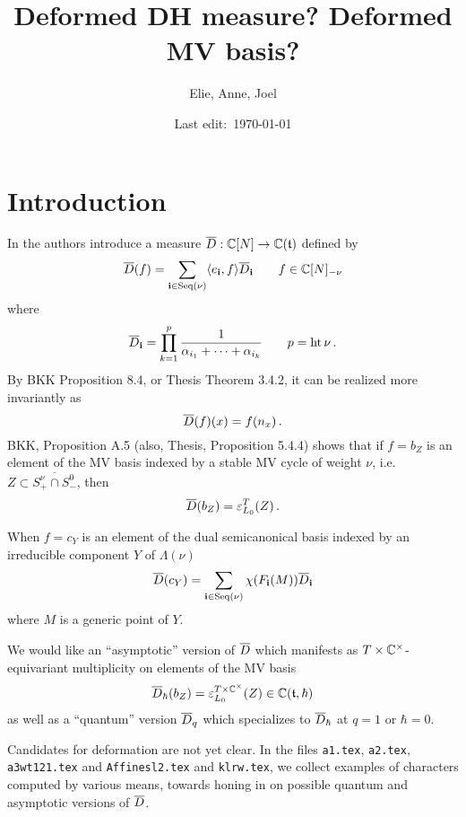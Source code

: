 \documentclass[11pt]{article}
\title{Deformed DH measure? Deformed MV basis?}
\author{Elie, Anne, Joel}
\date{Last edit:~\today}
\begin{document}
% 
\maketitle
% 
\section*{Introduction}
% 
In \cite{baumann2019mirkovic} the authors introduce a measure $\overline{D}:\mathbb C[N]\to\mathbb C(\mathfrak t)$ defined by 
\begin{equation}
    \label{eq:defbard}
    \overline{D}(f) = \sum_{\mathbf{i}\in\operatorname{Seq}(\nu)}\langle e_{\mathbf{i}},f\rangle\overline{D}_{\mathbf{i}}\qquad f \in \mathbb C[N]_{-\nu}
\end{equation}
where 
\begin{equation}
    \label{eq:bardi}
    \overline{D}_{\mathbf{i}} = \prod_{k=1}^p\frac{1}{\alpha_{i_1} + \cdots + \alpha_{i_k}} \qquad p = \operatorname{ht} \nu \,.
\end{equation}
By BKK Proposition 8.4, or Thesis Theorem 3.4.2, it can be realized more invariantly as 
\begin{equation}
    \label{eq:invbard}
     \overline{D}(f)(x) = f(n_x)\,.
\end{equation}
% 
BKK, Proposition A.5 (also, Thesis, Proposition 5.4.4) shows that if $f = b_Z$ is an element of the MV basis indexed by a stable MV cycle of weight $\nu$, i.e.\ $Z\subset \overline{S^\nu_+\cap S^0_-}$, then 
\begin{equation}
    \label{eq:bardaseqm}
    \overline{D}(b_Z) = \varepsilon_{L_0}^T (Z) \,. 
\end{equation}

When $f = c_Y$ is an element of the dual semicanonical basis indexed by an irreducible component $Y$ of $\Lambda(\nu)$
\begin{equation}
    \label{eq:bardaseu} %
    \barD(c_Y) = \sum_{\vi\in\Seq(\nu)}\chi(F_{\vi}(M))\barD_{\vi}
\end{equation}
where $M$ is a generic point of $Y$. 

We would like an ``asymptotic'' version of $\overline{D}$ which manifests as $T\times\mathbb C^\times$-equivariant multiplicity on elements of the MV basis
$$
\overline{D}_\hbar(b_Z) = \varepsilon_{L_0}^{T\times\mathbb C^\times} (Z) \in \mathbb C(\mathfrak t,\hbar)
$$
as well as a ``quantum'' version $\overline{D}_q$ which specializes to $\overline{D}_\hbar$ at $q = 1$ or $\hbar = 0$. 
% 

Candidates for deformation are not yet clear. In the files \texttt{a1.tex}, \texttt{a2.tex}, \texttt{a3wt121.tex} and \texttt{Affinesl2.tex} and \texttt{klrw.tex}, we collect examples of characters computed by various means, towards honing in on possible quantum and asymptotic versions of $\overline{D}$.
\end{document}
